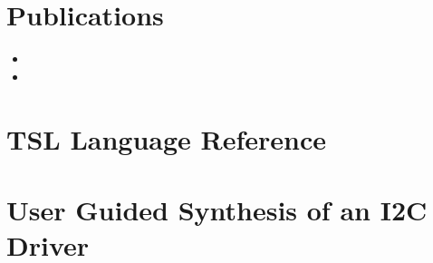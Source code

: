 \documentclass[a4paper,twoside,openright,11pt,oldfontcommands]{memoir}
\theoremstyle{definition}
\begin{document}
\tableofcontents
\clearpage

\listoffigures

\listoftables

\chapter{Publications}
\begin{itemize}
    \item {}
    \item {}
\end{itemize}

\mainmatter











\appendix
\chapter{TSL Language Reference}



\chapter{User Guided Synthesis of an I2C Driver}

\backmatter
\cleardoublepage


\end{document}
